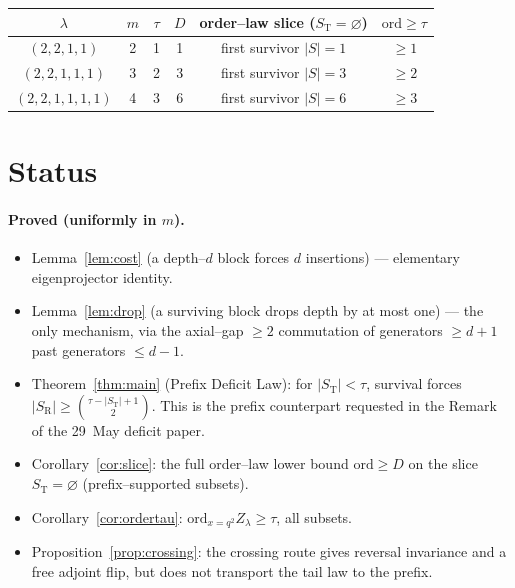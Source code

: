 \documentclass[11pt]{article}
\theoremstyle{definition}
\newcommand{\St}{S_{\mathrm T}}
\newcommand{\Sr}{S_{\mathrm R}}
\begin{document}
\begin{center}
\renewcommand{\arraystretch}{1.15}
\begin{tabular}{c|c|c|c|c|c}
\toprule
$\lambda$ & $m$ & $\tau$ & $D$ & order--law slice ($\St{=}\varnothing$) & $\mathrm{ord}\ge\tau$\\
\midrule
$(2,2,1,1)$     & 2 & 1 & 1 & first survivor $|S|{=}1$ & $\ge1$\\
$(2,2,1,1,1)$   & 3 & 2 & 3 & first survivor $|S|{=}3$ & $\ge2$\\
$(2,2,1,1,1,1)$ & 4 & 3 & 6 & first survivor $|S|{=}6$ & $\ge3$\\
\bottomrule
\end{tabular}
\end{center}

\section{Status}\label{sec:status}

\paragraph{Proved (uniformly in $m$).}
\begin{itemize}[topsep=0.2em,itemsep=0.1em]
\item Lemma~\ref{lem:cost} (a depth--$d$ block forces $d$ insertions) --- elementary
eigenprojector identity.
\item Lemma~\ref{lem:drop} (a surviving block drops depth by at most one) --- the only
mechanism, via the axial--gap $\ge2$ commutation of generators $\ge d+1$ past generators
$\le d-1$.
\item Theorem~\ref{thm:main} (Prefix Deficit Law): for $|\St|<\tau$, survival forces
$|\Sr|\ge\binom{\tau-|\St|+1}{2}$. This is the prefix counterpart requested in the Remark of the
29~May deficit paper.
\item Corollary~\ref{cor:slice}: the full order--law lower bound $\mathrm{ord}\ge D$ on the slice
$\St=\varnothing$ (prefix--supported subsets).
\item Corollary~\ref{cor:ordertau}: $\mathrm{ord}_{x=q^2}Z_\lambda\ge\tau$, all subsets.
\item Proposition~\ref{prop:crossing}: the crossing route gives reversal invariance and a free
adjoint flip, but does not transport the tail law to the prefix.
\end{itemize}
\end{document}
